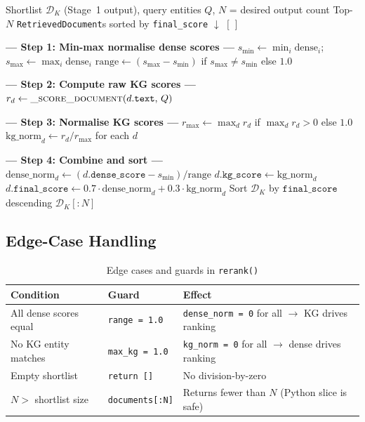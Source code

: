 \documentclass[12pt,a4paper]{article}
\theoremstyle{definition}
\theoremstyle{remark}
\begin{document}
\begin{algorithm}[H]
\caption{\texttt{NERKGReranker.rerank}($\mathcal{D}_K$, $Q$, $N$)}
\label{alg:rerank}
\begin{algorithmic}[1]
\Require Shortlist $\mathcal{D}_K$ (Stage~1 output), query entities $Q$,
         $N$ = desired output count
\Ensure Top-$N$ \texttt{RetrievedDocument}s sorted by \texttt{final\_score} $\downarrow$
 \Return $[\,]$ \EndIf

\State \textbf{--- Step 1: Min-max normalise dense scores ---}
\State $s_{\min} \gets \min_i \text{dense}_i$;\;
       $s_{\max} \gets \max_i \text{dense}_i$
\State $\text{range} \gets (s_{\max} - s_{\min})$ if $s_{\max} \neq s_{\min}$ else $1.0$

\State \textbf{--- Step 2: Compute raw KG scores ---}
  \State $r_d \gets \textsc{\_score\_document}(d.\texttt{text},\, Q)$
\EndFor

\State \textbf{--- Step 3: Normalise KG scores ---}
\State $r_{\max} \gets \max_d r_d$ if $\max_d r_d > 0$ else $1.0$
\State $\text{kg\_norm}_d \gets r_d / r_{\max}$ for each $d$

\State \textbf{--- Step 4: Combine and sort ---}
  \State $\text{dense\_norm}_d \gets (d.\texttt{dense\_score} - s_{\min}) / \text{range}$
  \State $d.\texttt{kg\_score} \gets \text{kg\_norm}_d$
  \State $d.\texttt{final\_score}
         \gets 0.7 \cdot \text{dense\_norm}_d + 0.3 \cdot \text{kg\_norm}_d$
\EndFor
\State Sort $\mathcal{D}_K$ by $\texttt{final\_score}$ descending
\State \Return $\mathcal{D}_K[:N]$
\end{algorithmic}
\end{algorithm}

\subsection{Edge-Case Handling}

\begin{table}[H]
\centering
\caption{Edge cases and guards in \texttt{rerank()}}
\begin{tabularx}{\textwidth}{lXX}
\toprule
Condition & Guard & Effect \\
\midrule
All dense scores equal & \texttt{range = 1.0} & \texttt{dense\_norm = 0} for all $\to$ KG drives ranking \\
No KG entity matches & \texttt{max\_kg = 1.0} & \texttt{kg\_norm = 0} for all $\to$ dense drives ranking \\
Empty shortlist & \texttt{return []} & No division-by-zero \\
$N >$ shortlist size & \texttt{documents[:N]} & Returns fewer than $N$ (Python slice is safe) \\
\bottomrule
\end{tabularx}
\end{table}
\end{document}
